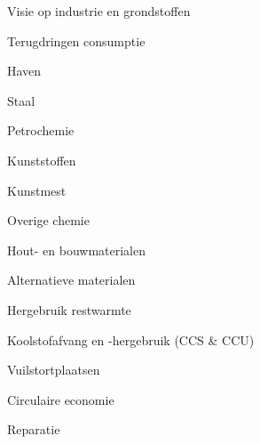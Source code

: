 
\begin{voorstel}{Visie op industrie en grondstoffen}\end{voorstel}

\begin{voorstel}{Terugdringen consumptie}\end{voorstel}
\begin{voorstel}{Haven}\end{voorstel}
\begin{voorstel}{Staal}\end{voorstel}
\begin{voorstel}{Petrochemie}\end{voorstel}
\begin{voorstel}{Kunststoffen}\end{voorstel}
\begin{voorstel}{Kunstmest}\end{voorstel}
\begin{voorstel}{Overige chemie}\end{voorstel}
\begin{voorstel}{Hout- en bouwmaterialen}\end{voorstel}
\begin{voorstel}{Alternatieve materialen}\end{voorstel}
\begin{voorstel}{Hergebruik restwarmte}\end{voorstel}
\begin{voorstel}{Koolstofafvang en -hergebruik (CCS \& CCU)}\end{voorstel}
\begin{voorstel}{Vuilstortplaatsen}\end{voorstel}
\begin{voorstel}{Circulaire economie}\end{voorstel}
\begin{voorstel}{Reparatie}\end{voorstel}
